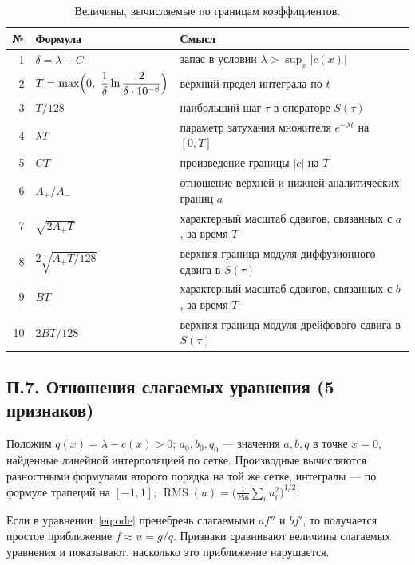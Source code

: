 \documentclass[14pt,a4paper]{extarticle}
\begin{document}
\begin{table}[!htbp]
\centering
\caption{Величины, вычисляемые по границам коэффициентов.}
\label{tab:app-derived}
\renewcommand{\arraystretch}{1.25}
\begin{tabular}{rl>{\raggedright\arraybackslash}p{}}
\toprule
№ & Формула & Смысл\\
\midrule
1 & $\delta=\lambda-C$ & запас в условии $\lambda>\sup_x|c(x)|$\\
2 & $T=\max\Bigl(0,\ \dfrac1\delta\ln\dfrac{2}{\delta\cdot10^{-8}}\Bigr)$ & верхний предел интеграла по $t$\\[8pt]
3 & $T/128$ & наибольший шаг $\tau$ в операторе $S(\tau)$\\
4 & $\lambda T$ & параметр затухания множителя $e^{-\lambda t}$ на $[0,T]$\\
5 & $CT$ & произведение границы $|c|$ на $T$\\
6 & $A_+/A_-$ & отношение верхней и нижней аналитических границ $a$\\
7 & $\sqrt{2A_+T}$ & характерный масштаб сдвигов, связанных с $a$, за время $T$\\
8 & $2\sqrt{A_+T/128}$ & верхняя граница модуля диффузионного сдвига в $S(\tau)$\\
9 & $BT$ & характерный масштаб сдвигов, связанных с $b$, за время $T$\\
10 & $2BT/128$ & верхняя граница модуля дрейфового сдвига в $S(\tau)$\\
\bottomrule
\end{tabular}
\end{table}

\subsection*{П.7. Отношения слагаемых уравнения (5 признаков)}
Положим $q(x)=\lambda-c(x)>0$; $a_0,b_0,q_0$ --- значения $a,b,q$ в точке
$x=0$, найденные линейной интерполяцией по сетке. Производные вычисляются
разностными формулами второго порядка на той же сетке, интегралы ---
по формуле трапеций на $[-1,1]$; $\operatorname{RMS}(u)=
\bigl(\frac1{256}\sum_iu_i^2\bigr)^{1/2}$.

Если в уравнении~\eqref{eq:ode} пренебречь слагаемыми $af''$ и $bf'$,
то получается простое приближение $f\approx u=g/q$. Признаки сравнивают
величины слагаемых уравнения и показывают, насколько это приближение
нарушается.
\end{document}

